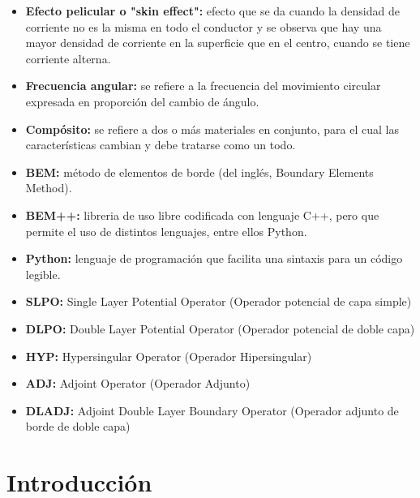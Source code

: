 \documentclass[12pt,letterpaper]{report}
\numberwithin{equation}{section}
\begin{document}
\begin{itemize}
	\item \textbf{Efecto pelicular o "skin effect":} efecto que se da cuando la densidad de corriente no es la misma en todo el conductor y se observa que hay una mayor densidad de corriente en la superficie que en el centro, cuando se tiene corriente alterna.
	\item \textbf{Frecuencia angular:} se refiere a la frecuencia del movimiento circular expresada en proporción del cambio de ángulo.
	\item \textbf{Compósito:} se refiere a dos o más materiales en conjunto, para el cual las características cambian y debe tratarse como un todo.
	\item \textbf{BEM:} método de elementos de borde (del inglés, Boundary Elements Method).
	\item \textbf{BEM++:} libreria de uso libre codificada con lenguaje C++, pero que permite el uso de distintos lenguajes, entre ellos Python.
	\item \textbf{Python:} lenguaje de programación que facilita una sintaxis para un código legible.
	
	\item \textbf{SLPO:} Single Layer Potential Operator (Operador potencial de capa simple)
	
	\item \textbf{DLPO:} Double Layer Potential Operator (Operador potencial de doble capa)
	
	\item \textbf{HYP:} Hypersingular Operator (Operador Hipersingular)
	
	\item \textbf{ADJ:} Adjoint Operator (Operador Adjunto)
	
	\item \textbf{DLADJ:} Adjoint Double Layer Boundary Operator (Operador adjunto de borde de doble capa) 
	

\end{itemize}

\pagebreak
\tableofcontents

\pagebreak
{}

\chapter{Introducción}
\end{document}
